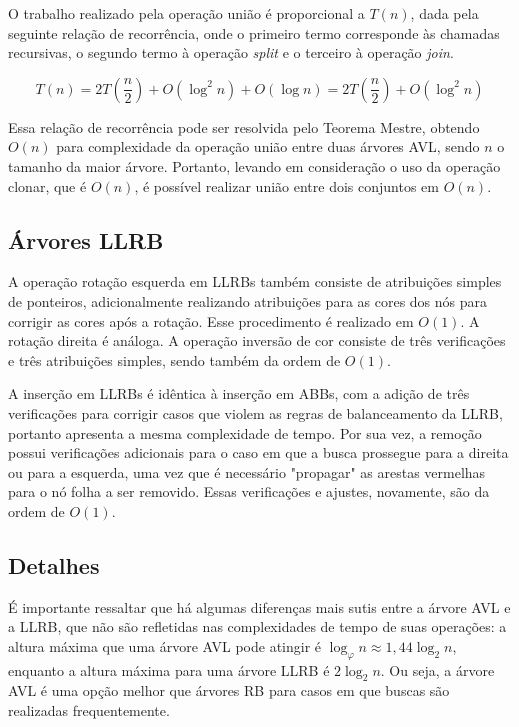 \documentclass[a4paper,12pt]{report}
\begin{document}
O trabalho realizado pela operação união é proporcional a $T(n)$, dada pela seguinte 
relação de recorrência, onde o primeiro termo corresponde às chamadas recursivas,
o segundo termo à operação \textit{split} e o terceiro à operação \textit{join}.

\[
            T(n) = 2T\left(\frac{n}{2}\right) + O(\log^2 n) + O(\log n) 
                 = 2T\left(\frac{n}{2}\right) + O(\log^2 n)
\]

Essa relação de recorrência pode ser resolvida pelo Teorema Mestre, obtendo $O(n)$ para
complexidade da operação união entre duas árvores AVL, sendo $n$ o tamanho da maior árvore.
Portanto, levando em consideração o uso da operação clonar, que é $O(n)$, é possível 
realizar união entre dois conjuntos em $O(n)$.

\subsection*{Árvores LLRB}

A operação rotação esquerda em LLRBs também consiste de atribuições simples de ponteiros,
adicionalmente realizando atribuições para as cores dos nós para corrigir as cores após a
rotação. Esse procedimento é realizado em $O(1)$. A rotação direita é análoga. A operação
inversão de cor consiste de três verificações e três atribuições simples, sendo também da
ordem de $O(1)$.

A inserção em LLRBs é idêntica à inserção em ABBs, com a adição de três verificações
para corrigir casos que violem as regras de balanceamento da LLRB, portanto apresenta
a mesma complexidade de tempo. Por sua vez, a remoção possui verificações adicionais 
para o caso em que a busca prossegue para a direita ou para a esquerda, uma vez que é
necessário "propagar" as arestas vermelhas para o nó folha a ser removido. Essas 
verificações e ajustes, novamente, são da ordem de $O(1)$.

\subsection*{Detalhes}

É importante ressaltar que há algumas diferenças mais sutis entre a árvore AVL e a LLRB,
que não são refletidas nas complexidades de tempo de suas operações: a altura máxima que
uma árvore AVL pode atingir é $\log_{\varphi} n \approx 1{,}44 \log_2 n$, enquanto 
a altura máxima para uma árvore LLRB é $2 \log_2 n$. Ou seja, a árvore AVL é uma 
opção melhor que árvores RB para casos em que buscas são realizadas frequentemente.

\printbibliography
\end{document}
